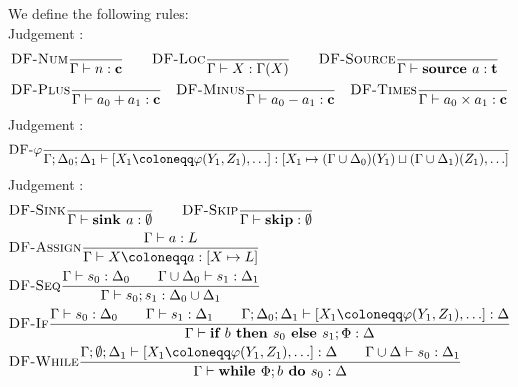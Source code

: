 We define the following rules:\\
Judgement :
\begin{align*}
    &\rule{DF-Num}{}{\typestep{\Gamma}{n}{\lclean}}\qquad
    \rule{DF-Loc}{}{\typestep{\Gamma}{X}{\Gamma(X)}}\qquad%
    \rule{DF-Source}{}{\typestep{\Gamma}{\source{a}}{\ltracked}}\\
    &\rule{DF-Plus}{}{\typestep{\Gamma}{a_0+a_1}{\lclean}}\quad
    \rule{DF-Minus}{}{\typestep{\Gamma}{a_0-a_1}{\lclean}}\quad
    \rule{DF-Times}{}{\typestep{\Gamma}{a_0 \times a_1}{\lclean}}
\end{align*}
Judgement :
\begin{align*}
    &\rule{DF-$\varphi$}{}{\typestep{\Gamma;\Delta_0;\Delta_1}{\defaultphilist}
    {[X_1 \mapsto (\Gamma \union \Delta_0)(Y_1) \join (\Gamma \union \Delta_1)(Z_1), \ldots]}}\\
\end{align*}
Judgement :
\begin{align*}
    &\rule{DF-Sink}{}{\typestep{\Gamma}{\sink{a}}{\emptyset}}\qquad
    \rule{DF-Skip}{}{\typestep{\Gamma}{\skipcmd}{\emptyset}}\\
    &\rule{DF-Assign}{\typestep{\Gamma}{a}{L}}{\typestep{\Gamma}{\defaultstore}{[X \mapsto L]}}\\%
    &\rule{DF-Seq}{\typestep{\Gamma}{s_0}{\Delta_0}\qquad
    \typestep{\Gamma \cup \Delta_0}{s_1}{\Delta_1}}{\typestep{\Gamma}{\defaultssaseq}{\Delta_0 \cup \Delta_1}}\\
    &\rule{DF-If}{\typestep{\Gamma}{s_0}{\Delta_0}\qquad \typestep{\Gamma}{s_1}{\Delta_1}\qquad
    \typestep{\Gamma;\Delta_0;\Delta_1}{\defaultphilist}{\Delta}}
    {\typestep{\Gamma}{\defaultssaif}{\Delta}}\\
    &\rule{DF-While}{\typestep{\Gamma;\emptyset;\Delta_1}{\defaultphilist}{\Delta}\qquad
    \typestep{\Gamma \cup \Delta}{s_0}{\Delta_1}}
    {\typestep{\Gamma}{\defaultssawhile}{\Delta}}
\end{align*}
\fi


\iffalse
